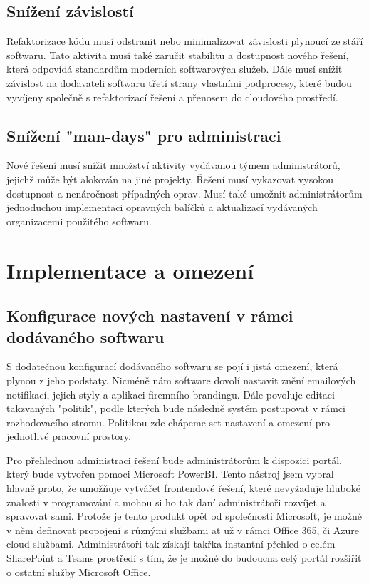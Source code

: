 \documentclass[12pt]{article}
\begin{document}
\begin{sloppypar}
\begin{spacing}{1.15}
        \subsection*{Snížení závislostí}
        Refaktorizace kódu musí odstranit nebo minimalizovat závislosti plynoucí
        ze stáří softwaru. Tato aktivita musí také zaručit stabilitu a dostupnost
        nového řešení, která odpovídá standardům moderních softwarových služeb.
        Dále musí snížit závislost na dodavateli softwaru třetí strany vlastními
        podprocesy, které budou vyvíjeny společně s refaktorizací řešení a
        přenosem do cloudového prostředí.

        \subsection*{Snížení "man-days" pro administraci}
        Nové řešení musí snížit množství aktivity vydávanou týmem
        administrátorů, jejichž může být alokován na jiné projekty. Řešení musí
        vykazovat vysokou dostupnost a nenáročnost případných oprav. Musí také
        umožnit administrátorům jednoduchou implementaci opravných balíčků a
        aktualizací vydávaných organizacemi použitého softwaru. 

        \section*{Implementace a omezení}
        \subsection*{Konfigurace nových nastavení v rámci dodávaného softwaru}
        S dodatečnou konfigurací dodávaného softwaru se pojí i jistá omezení,
        která plynou z jeho podstaty. Nicméně nám software dovolí nastavit
        znění emailových notifikací, jejich styly a aplikaci firemního
        brandingu. Dále povoluje editaci takzvaných "politik", podle kterých
        bude následně systém postupovat v rámci rozhodovacího stromu. Politikou
        zde chápeme set nastavení a omezení pro jednotlivé pracovní prostory.
        
        Pro přehlednou administraci řešení bude administrátorům k dispozici
        portál, který bude vytvořen pomoci Microsoft PowerBI. Tento nástroj jsem
        vybral hlavně proto, že umožňuje vytvářet frontendové řešení, které
        nevyžaduje hluboké znalosti v programování a mohou si ho tak daní
        administrátoři rozvíjet a spravovat sami. Protože je tento produkt opět
        od společnosti Microsoft, je možné v něm definovat propojení s různými
        službami ať už v rámci Office 365, či Azure cloud službami.
        Administrátoři tak získají takřka instantní přehled o celém SharePoint a
        Teams prostředí s tím, že je možné do budoucna celý portál rozšířit o
        ostatní služby Microsoft Office.


\end{spacing}
\end{sloppypar}
\end{document}
